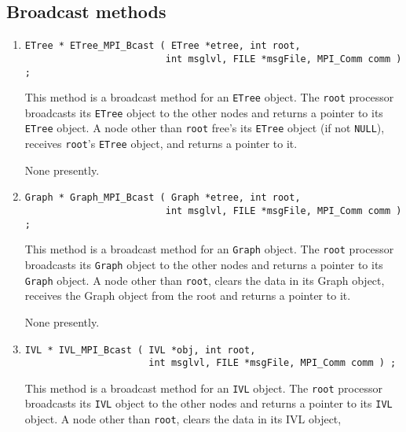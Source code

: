 \subsection{Broadcast methods}
\label{subsection:MPI:proto:broadcast}
\par
\begin{enumerate}
\item
\begin{verbatim}
ETree * ETree_MPI_Bcast ( ETree *etree, int root, 
                         int msglvl, FILE *msgFile, MPI_Comm comm ) ;
\end{verbatim}
This method is a broadcast method for an {\tt ETree} object.
The {\tt root} processor broadcasts its {\tt ETree} object to the
other nodes and returns a pointer to its {\tt ETree} object.
A node other than {\tt root} free's its {\tt ETree} object
(if not {\tt NULL}), receives {\tt root}'s {\tt ETree} object,
and returns a pointer to it.
\par {}
None presently.
\item
\begin{verbatim}
Graph * Graph_MPI_Bcast ( Graph *etree, int root, 
                         int msglvl, FILE *msgFile, MPI_Comm comm ) ;
\end{verbatim}
This method is a broadcast method for an {\tt Graph} object.
The {\tt root} processor broadcasts its {\tt Graph} object to the
other nodes and returns a pointer to its {\tt Graph} object.
A node other than {\tt root}, clears the data in its Graph object,
receives the Graph object from the root
and returns a pointer to it.
\par {}
None presently.
\item
\begin{verbatim}
IVL * IVL_MPI_Bcast ( IVL *obj, int root, 
                      int msglvl, FILE *msgFile, MPI_Comm comm ) ;
\end{verbatim}
This method is a broadcast method for an {\tt IVL} object.
The {\tt root} processor broadcasts its {\tt IVL} object to the
other nodes and returns a pointer to its {\tt IVL} object.
A node other than {\tt root}, clears the data in its IVL object,

\end{enumerate}
